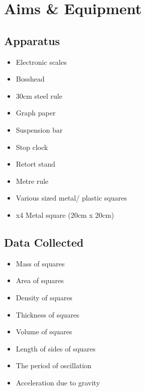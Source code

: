 \documentclass[12pt]{article}
\begin{document}

\section{Aims \& Equipment}
\label{AimsEquipmentSection}


\subsection{Apparatus}
\label{Apparatus SubSection}

\begin{multicols}{3}
\begin{itemize}
    \item{Electronic scales}
    \item{Bosshead}
    \item{30cm steel rule}
    \item{Graph paper}
    \item{Suspension bar}
    \item{Stop clock}
    \item{Retort stand}
    \item{Metre rule}
    \item{Various sized metal/ plastic squares}
    \item{x4 Metal square (20cm x 20cm)}
\end{itemize}
\end{multicols}


\subsection{Data Collected}
\label{Data Collected SubSection}

\begin{multicols}{3}
\begin{itemize}
    \item{Mass of squares}
    \item{Area of squares}
    \item{Density of squares}
    \item{Thickness of squares}
    \item{Volume of squares}
    \item{Length of sides of squares}
    \item{The period of oscillation}
    \item{Acceleration due to gravity}
\end{itemize}
\end{multicols}
\end{document}

